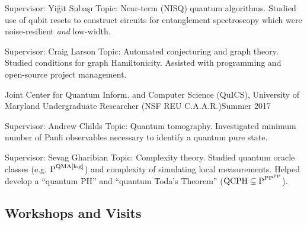 \documentclass[11pt,letterpaper,serif]{moderncv}
\begin{document}
{
	\begin{adjustwidth}{.25in}{}
		Supervisor: Yi\u{g}it Suba\c{s}\i \newline
		Topic: Near-term (NISQ) quantum algorithms. Studied use of qubit resets to construct circuits for entanglement spectroscopy which were noise-resilient \textit{and} low-width.
	\end{adjustwidth}
}

{
	\begin{adjustwidth}{.25in}{}
		Supervisor: Craig Larson \newline
		Topic: Automated conjecturing and graph theory. Studied conditions for graph Hamiltonicity. Assisted with programming and open-source project management.
	\end{adjustwidth}
}

\cventry{}
{\small Joint Center for Quantum Inform. and Computer Science (QuICS), University of Maryland}
{Undergraduate Researcher {\small(NSF REU C.A.A.R.)}}{Summer 2017}{}
{
	\begin{adjustwidth}{.25in}{}
		Supervisor: Andrew Childs \newline
		Topic: Quantum tomography. Investigated minimum number of Pauli observables necessary to identify a quantum pure state.
	\end{adjustwidth}
}

{
	\begin{adjustwidth}{.25in}{}
		Supervisor: Sevag Gharibian \newline
		Topic: Complexity theory. Studied quantum oracle classes  (e.g. {\scriptsize $\textup{P}^{\textup{QMA[log]}}$}) and complexity of simulating local measurements. Helped develop a ``quantum PH'' and ``quantum Toda's Theorem'' ({\scriptsize $\textup{QCPH}\subseteq \textup{P}^{\textup{PP}^{\textup{PP}}}$}).
	\end{adjustwidth}
}


\subsection{Workshops and Visits}
\end{document}
